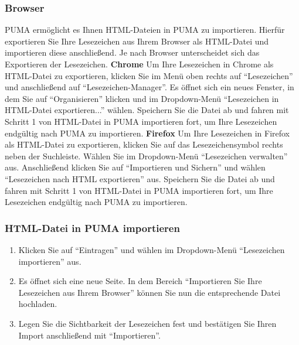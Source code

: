 \documentclass[b5paper,11pt,twoside]{scrbook} %
\begin{document}
\subsubsection{Browser}
PUMA ermöglicht es Ihnen HTML-Dateien in PUMA zu importieren. Hierfür exportieren Sie Ihre Lesezeichen aus Ihrem Browser als HTML-Datei und importieren diese anschließend. Je nach Browser unterscheidet sich das Exportieren der Lesezeichen.
\newline
\newline
\textbf{Chrome}%
\newline Um Ihre Lesezeichen in Chrome als HTML-Datei zu exportieren, klicken Sie im Menü oben rechts auf \enquote{Lesezeichen} und anschließend auf \enquote{Lesezeichen-Manager}. Es öffnet sich ein neues Fenster, in dem Sie auf \enquote{Organisieren} klicken und im Dropdown-Menü \enquote{Lesezeichen in HTML-Datei exportieren...} wählen. Speichern Sie die Datei ab und fahren mit Schritt 1 von HTML-Datei in PUMA importieren fort, um Ihre Lesezeichen endgültig nach PUMA zu importieren.  
\newline
\newline
\textbf{Firefox}
\newline Um Ihre Lesezeichen in Firefox als HTML-Datei zu exportieren, klicken Sie auf das Lesezeichensymbol rechts neben der Suchleiste. Wählen Sie im Dropdown-Menü \enquote{Lesezeichen verwalten} aus. Anschließend klicken Sie auf \enquote{Importieren und Sichern} und wählen \enquote{Lesezeichen nach HTML exportieren} aus. Speichern Sie die Datei ab und fahren mit Schritt 1 von HTML-Datei in PUMA importieren fort, um Ihre Lesezeichen endgültig nach PUMA zu importieren.  
\subsubsection{HTML-Datei in PUMA importieren}
\begin{enumerate}
    \item Klicken Sie auf \enquote{Eintragen} und wählen im Dropdown-Menü \enquote{Lesezeichen importieren} aus.
    \item Es öffnet sich eine neue Seite. In dem Bereich \enquote{Importieren Sie Ihre Lesezeichen aus Ihrem Browser} können Sie nun die entsprechende Datei hochladen. 
    \item Legen Sie die Sichtbarkeit der Lesezeichen fest und bestätigen Sie Ihren Import anschließend mit \enquote{Importieren}.
\end{enumerate}
\end{document}
